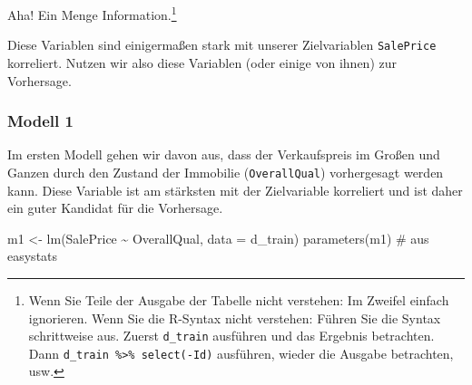 \documentclass[
  letterpaper,
]{scrbook}
\newenvironment{Shaded}{\begin{snugshade}}{\end{snugshade}}
\newcommand{\AttributeTok}[1]{\textcolor[rgb]{0.40,0.45,0.13}{#1}}
\newcommand{\CommentTok}[1]{\textcolor[rgb]{0.37,0.37,0.37}{#1}}
\newcommand{\FunctionTok}[1]{\textcolor[rgb]{0.28,0.35,0.67}{#1}}
\newcommand{\NormalTok}[1]{\textcolor[rgb]{0.00,0.23,0.31}{#1}}
\newcommand{\OtherTok}[1]{\textcolor[rgb]{0.00,0.23,0.31}{#1}}
\newcommand{\SpecialCharTok}[1]{\textcolor[rgb]{0.37,0.37,0.37}{#1}}
\theoremstyle{definition}
\theoremstyle{definition}
\theoremstyle{definition}
\theoremstyle{remark}
\begin{document}
Aha! Ein Menge Information.\footnote{Wenn Sie Teile der Ausgabe der
  Tabelle nicht verstehen: Im Zweifel einfach ignorieren. Wenn Sie die
  R-Syntax nicht verstehen: Führen Sie die Syntax schrittweise aus.
  Zuerst \texttt{d\_train} ausführen und das Ergebnis betrachten. Dann
  \texttt{d\_train\ \%\textgreater{}\%\ select(-Id)} ausführen, wieder
  die Ausgabe betrachten, usw.}

Diese Variablen sind einigermaßen stark mit unserer Zielvariablen
\texttt{SalePrice} korreliert. Nutzen wir also diese Variablen (oder
einige von ihnen) zur Vorhersage.

\subsubsection{Modell 1}\label{modell-1}

Im ersten Modell gehen wir davon aus, dass der Verkaufspreis im Großen
und Ganzen durch den Zustand der Immobilie (\texttt{OverallQual})
vorhergesagt werden kann. Diese Variable ist am stärksten mit der
Zielvariable korreliert und ist daher ein guter Kandidat für die
Vorhersage.

\begin{Shaded}
\begin{Highlighting}[]
\NormalTok{m1 }\OtherTok{\textless{}{-}} \FunctionTok{lm}\NormalTok{(SalePrice }\SpecialCharTok{\textasciitilde{}}\NormalTok{ OverallQual, }\AttributeTok{data =}\NormalTok{ d\_train)}
\FunctionTok{parameters}\NormalTok{(m1)  }\CommentTok{\# aus easystats}
\end{Highlighting}
\end{Shaded}
\end{document}
